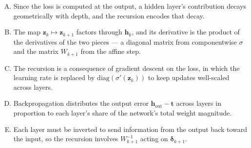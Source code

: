 \documentclass[12pt]{amsart}
\begin{document}
\begin{enumerate}[(A)]
\item Since the loss is computed at the output, a hidden layer's contribution decays geometrically with depth, and the recursion encodes that decay.
\item The map $\mathbf{z}_k \mapsto \mathbf{z}_{k+1}$ factors through $\mathbf{h}_k$, and its derivative is the product of the derivatives of the two pieces --- a diagonal matrix from componentwise $\sigma$ and the matrix $W_{k+1}$ from the affine step. %
\item The recursion is a consequence of gradient descent on the loss, in which the learning rate is replaced by $\mathrm{diag}(\sigma'(\mathbf{z}_k))$ to keep updates well-scaled across layers.
\item Backpropagation distributes the output error $\mathbf{h}_{\text{out}} - \mathbf{t}$ across layers in proportion to each layer's share of the network's total weight magnitude.
\item Each layer must be inverted to send information from the output back toward the input, so the recursion involves $W_{k+1}^{-1}$ acting on $\boldsymbol{\delta}_{k+1}$.
\end{enumerate}
\end{document}
